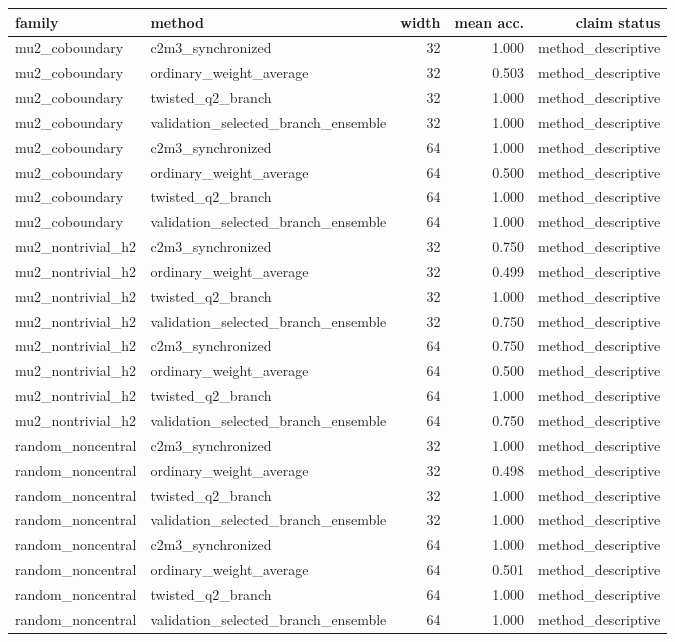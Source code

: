 \begin{tabular}{llrrr}
\toprule
family & method & width & mean acc. & claim status\\
\midrule
mu2_coboundary & c2m3_synchronized & 32 & 1.000 & method_descriptive\\
mu2_coboundary & ordinary_weight_average & 32 & 0.503 & method_descriptive\\
mu2_coboundary & twisted_q2_branch & 32 & 1.000 & method_descriptive\\
mu2_coboundary & validation_selected_branch_ensemble & 32 & 1.000 & method_descriptive\\
mu2_coboundary & c2m3_synchronized & 64 & 1.000 & method_descriptive\\
mu2_coboundary & ordinary_weight_average & 64 & 0.500 & method_descriptive\\
mu2_coboundary & twisted_q2_branch & 64 & 1.000 & method_descriptive\\
mu2_coboundary & validation_selected_branch_ensemble & 64 & 1.000 & method_descriptive\\
mu2_nontrivial_h2 & c2m3_synchronized & 32 & 0.750 & method_descriptive\\
mu2_nontrivial_h2 & ordinary_weight_average & 32 & 0.499 & method_descriptive\\
mu2_nontrivial_h2 & twisted_q2_branch & 32 & 1.000 & method_descriptive\\
mu2_nontrivial_h2 & validation_selected_branch_ensemble & 32 & 0.750 & method_descriptive\\
mu2_nontrivial_h2 & c2m3_synchronized & 64 & 0.750 & method_descriptive\\
mu2_nontrivial_h2 & ordinary_weight_average & 64 & 0.500 & method_descriptive\\
mu2_nontrivial_h2 & twisted_q2_branch & 64 & 1.000 & method_descriptive\\
mu2_nontrivial_h2 & validation_selected_branch_ensemble & 64 & 0.750 & method_descriptive\\
random_noncentral & c2m3_synchronized & 32 & 1.000 & method_descriptive\\
random_noncentral & ordinary_weight_average & 32 & 0.498 & method_descriptive\\
random_noncentral & twisted_q2_branch & 32 & 1.000 & method_descriptive\\
random_noncentral & validation_selected_branch_ensemble & 32 & 1.000 & method_descriptive\\
random_noncentral & c2m3_synchronized & 64 & 1.000 & method_descriptive\\
random_noncentral & ordinary_weight_average & 64 & 0.501 & method_descriptive\\
random_noncentral & twisted_q2_branch & 64 & 1.000 & method_descriptive\\
random_noncentral & validation_selected_branch_ensemble & 64 & 1.000 & method_descriptive\\
\bottomrule
\end{tabular}
